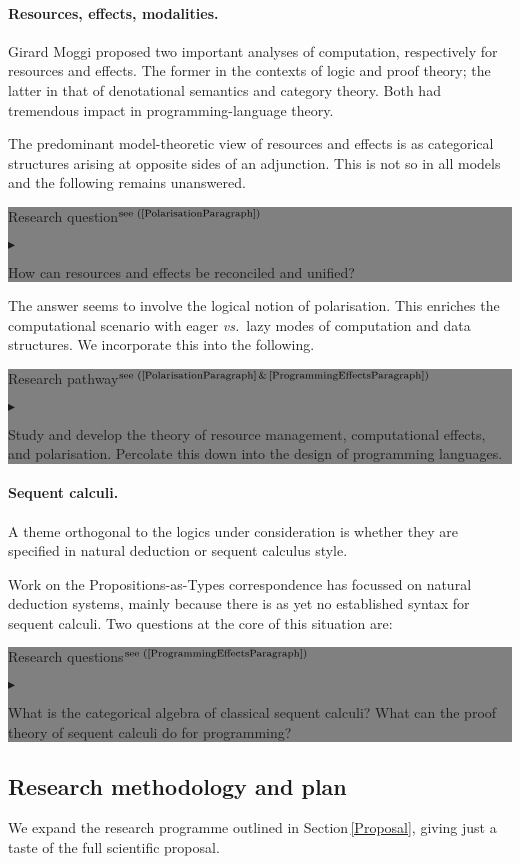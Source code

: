 \documentclass[11pt,twocolumn]{article}
\newenvironment{btritemize}
  {\begin{list}{\btr}
  {\setlength{\topsep}{2pt}
   \setlength{\partopsep}{2pt}
   \setlength{\itemsep}{2.5pt}
   \setlength{\parsep}{2.5pt}
   \setlength{\leftmargin}{1em}
   \setlength{\labelwidth}{.5em}}}
  {\end{list}}
\newcommand{\mytextsf}[1]{\textsf{\small #1}}
\newcommand{\vs}{\emph{vs.}}
\newcommand{\btr}{$\blacktriangleright$}
\newcommand{\reqpsize}{8.113395cm}%
\newcommand{\req}[2]{\begin{center}\colorbox{grey}{\begin{minipage}{\reqpsize} 
  \mytextsf{Research question}\hfill$^{\mbox{\scriptsize see (#1) }}$\\[-5.5mm]
  \begin{btritemize}
  \item #2
  \end{btritemize}
\end{minipage}}\end{center}}
\newcommand{\reqs}[2]{\begin{center}\colorbox{grey}{\begin{minipage}{\reqpsize}
  \mytextsf{Research questions}\hfill$^{\mbox{\scriptsize see (#1) }}$\\[-5.5mm]
  \begin{btritemize}
  \item #2
  \end{btritemize}
\end{minipage}}\end{center}}
\newcommand{\rep}[2]{\begin{center}\colorbox{grey}{\begin{minipage}{\reqpsize}
  \mytextsf{Research pathway}\hfill$^{\mbox{\scriptsize see (#1) }}$\\[-5.5mm]
  \begin{btritemize}
  \item #2
  \end{btritemize}
\end{minipage}}\end{center}}
\begin{document}
\paragraph*{Resources, effects, modalities.}

Girard %
Moggi %
proposed two important analyses of computation, respectively for resources and
effects.  The former in the contexts of logic and proof theory; the latter in
that of denotational semantics and category theory.  Both had tremendous
impact in programming-language theory.  

The predominant model-theoretic view of resources and effects is as
categorical structures arising at opposite sides of an adjunction.  This is
not so in all models and the following remains unanswered.
%
\req{\ref{PolarisationParagraph}}
  {How can resources and effects be reconciled and unified?}
%
The answer seems to involve the logical notion of
polarisation. %
This enriches the computational scenario with eager \vs~lazy modes of
computation and data structures.  We incorporate this into the following.
%
\rep{\ref{PolarisationParagraph}\,\&\,\ref{ProgrammingEffectsParagraph}}
  {Study and develop the theory of resource management, computational
    effects, and polarisation.  Percolate this down into the design of
    programming languages.}

\paragraph*{Sequent calculi.}

A theme orthogonal to the logics under consideration is whether they are
specified in natural deduction or sequent calculus style. 

Work on the Propositions-as-Types correspondence has focussed on natural
deduction systems, mainly because there is as yet no established syntax for
sequent calculi.  Two questions at the core of this situation are:
%
\reqs{\ref{ProgrammingEffectsParagraph}}
  {What is the categorical algebra of classical sequent calculi? %
%
  What can the proof theory of sequent calculi do for programming?}

\subsection{Research methodology and plan}

We expand the research programme outlined in Section\,\ref{Proposal}, giving
just a taste of the full scientific proposal.
\end{document}
